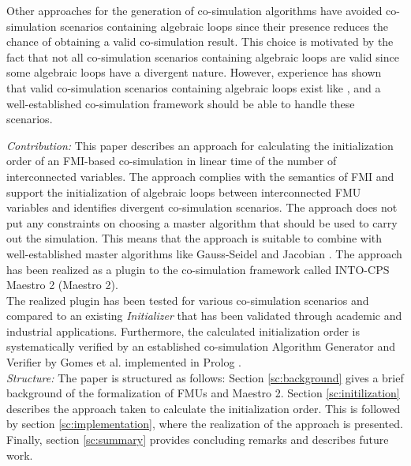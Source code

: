 \noindent Other approaches for the generation of co-simulation algorithms have avoided co-simulation scenarios containing algebraic loops since their presence reduces the chance of obtaining a valid co-simulation result\cite{Amalio2016CheckingCo-simulation, BromanCompositionCo-Simulation}. This choice is motivated by the fact that not all co-simulation scenarios containing algebraic loops are valid since some algebraic loops have a divergent nature. However, experience has shown that valid co-simulation scenarios containing algebraic loops exist like , and a well-established co-simulation framework should be able to handle these scenarios. 

\textit{Contribution:} This paper describes an approach for calculating the initialization order of an FMI-based co-simulation in linear time of the number of interconnected variables. The approach complies with the semantics of FMI and support the initialization of algebraic loops between interconnected FMU variables and identifies divergent co-simulation scenarios. The approach does not put any constraints on choosing a master algorithm that should be used to carry out the simulation. This means that the approach is suitable to combine with well-established master algorithms like Gauss-Seidel and Jacobian \cite{Palensky2017}. The approach has been realized as a plugin to the co-simulation framework called INTO-CPS Maestro 2 (Maestro 2). \\
The realized plugin has been tested for various co-simulation scenarios and compared to an existing \textit{Initializer} that has been validated through academic and industrial applications. 
Furthermore, the calculated initialization order is systematically verified by an established co-simulation Algorithm Generator and Verifier by Gomes et al. implemented in Prolog \cite{gomes_lucio_vangheluwe_2019}. \\

\textit{Structure:} The paper is structured as follows: Section \ref{sc:background} gives a brief background of the formalization of FMUs and Maestro 2. Section \ref{sc:initilization} describes the approach taken to calculate the initialization order. This is followed by section \ref{sc:implementation}, where the realization of the approach is presented. Finally, section \ref{sc:summary} provides concluding remarks and describes future work.
